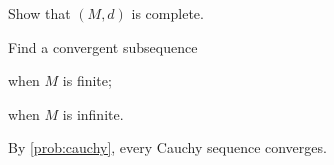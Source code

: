 \begin{parts}[label=(\roman*)]
  \item Show that $(M, d)$ is complete.
  \item Find a convergent subsequence
  \begin{subparts}
    \item when $M$ is finite;
    \item when $M$ is infinite.
  \end{subparts}
\end{parts}
\begin{solution}
By \cref{prob:cauchy}, every Cauchy sequence converges.
\end{solution}
